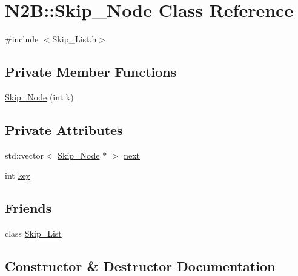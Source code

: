 \hypertarget{class_n2_b_1_1_skip___node}{}\section{N2B\+:\+:Skip\+\_\+\+Node Class Reference}
\label{class_n2_b_1_1_skip___node}


{\ttfamily \#include $<$Skip\+\_\+\+List.\+h$>$}

\subsection*{Private Member Functions}
\begin{DoxyCompactItemize}
\item 
\hyperlink{class_n2_b_1_1_skip___node_a61f33d0a76f7300f26609e4ff746982e}{Skip\+\_\+\+Node} (int k)
\end{DoxyCompactItemize}
\subsection*{Private Attributes}
\begin{DoxyCompactItemize}
\item 
std\+::vector$<$ \hyperlink{class_n2_b_1_1_skip___node}{Skip\+\_\+\+Node} $\ast$ $>$ \hyperlink{class_n2_b_1_1_skip___node_aa267b544ef66b0767a1a3c97b06bfa6c}{next}
\item 
int \hyperlink{class_n2_b_1_1_skip___node_a2b8c84897040cc57696d66c7b64aee54}{key}
\end{DoxyCompactItemize}
\subsection*{Friends}
\begin{DoxyCompactItemize}
\item 
class \hyperlink{class_n2_b_1_1_skip___node_a498dde5f6f7a55e5d917f72000deeee1}{Skip\+\_\+\+List}
\end{DoxyCompactItemize}


\subsection{Constructor \& Destructor Documentation}
\mbox{\label{class_n2_b_1_1_skip___node_a61f33d0a76f7300f26609e4ff746982e}} 
